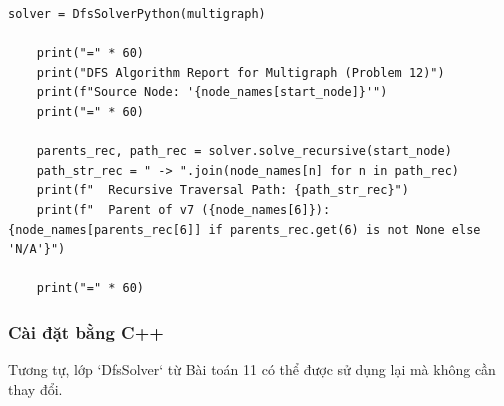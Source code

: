 \documentclass[a4paper,12pt]{article}
\begin{document}
\begin{lstlisting}[style=pythonstyle, caption={Cài đặt DFS cho đa đồ thị trong Python.}, label={lst:python_dfs_12}]
    solver = DfsSolverPython(multigraph)
    
    print("=" * 60)
    print("DFS Algorithm Report for Multigraph (Problem 12)")
    print(f"Source Node: '{node_names[start_node]}'")
    print("=" * 60)
    
    parents_rec, path_rec = solver.solve_recursive(start_node)
    path_str_rec = " -> ".join(node_names[n] for n in path_rec)
    print(f"  Recursive Traversal Path: {path_str_rec}")
    print(f"  Parent of v7 ({node_names[6]}): {node_names[parents_rec[6]] if parents_rec.get(6) is not None else 'N/A'}")
    
    print("=" * 60)
\end{lstlisting}

\subsubsection{Cài đặt bằng C++ }
Tương tự, lớp `DfsSolver` từ Bài toán 11 có thể được sử dụng lại mà không cần thay đổi.
\end{document}
